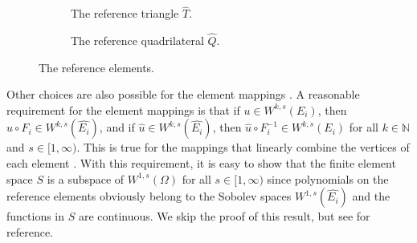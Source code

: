 \documentclass[english, 12pt, a4paper, sci, utf8, a-2b, online]{aaltothesis}
\theoremstyle{definition}
\theoremstyle{plain}
\numberwithin{equation}{section}
\begin{document}
\begin{figure}[t]
    \centering
    \begin{subfigure}[t]{0.48\textwidth}
        \centering
        \caption{The reference triangle $\widehat{T}$.}
        \label{fig:reference_elements_tri}
    \end{subfigure}
    \hfill
    \begin{subfigure}[t]{0.48\textwidth}
        \centering
        \caption{The reference quadrilateral $\widehat{Q}$.}
        \label{fig:reference_elements_quad}
    \end{subfigure}
    \caption{The reference elements.}
    \label{fig:reference_elements}
\end{figure}

Other choices are also possible for the element mappings \cite{szabobabuska2011}.
A reasonable requirement for the element mappings is that
if $u \in W^{k,s}(E_i)$, then $u \circ F_i \in W^{k,s}(\widehat{E_i})$, and
if $\hat{u} \in W^{k,s}(\widehat{E_i})$, then $\hat{u} \circ F_{i}^{-1} \in W^{k,s}(E_i)$
for all $k \in \mathbb{N}$ and $s \in [1, \infty)$.
This is true for the mappings that linearly combine
the vertices of each element \cite[Theorem 1 on p.~13]{mazya2011}.
With this requirement, it is easy to show that the finite element space $S$ is
a subspace of $W^{1,s}(\Omega)$ for all $s \in [1, \infty)$ since
polynomials on the reference elements obviously belong to the Sobolev spaces
$W^{1,s}(\widehat{E_i})$ and the functions in $S$ are continuous.
We skip the proof of this result, but see \cite[Theorem~5.2 on p.~62]{braess2007} for reference.
\end{document}
